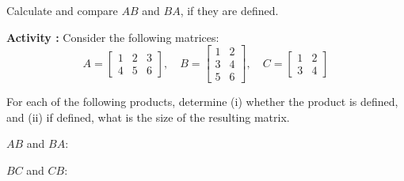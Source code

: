 \documentclass{article}
\newif\ifshowanswers
\newcommand{\answer}[2][4cm]{%
	\noindent\framebox[\textwidth]{%
		\begin{minipage}[t][#1][t]{\dimexpr\textwidth-2\fboxsep-2\fboxrule\relax}
			\ifshowanswers
			{\color{answercolor}#2\par}
			\fi
		\end{minipage}%
	}
}
\newcounter{commoncount}
\newcommand\activity{\refstepcounter{commoncount}\textbf{Activity \thecommoncount:} }
\begin{document}
Calculate and compare $AB$ and $BA$, if they are defined. 

\answer[5cm]{
	\[AB = \begin{bmatrix}
		4 & 3 \\
		-23 & -18
	\end{bmatrix}\]
	
	\[BA = \begin{bmatrix}
		-3 & 12 \\
		3 & -11
	\end{bmatrix}\]
	
	The products $AB$ and $BA$ exist but are not equal.
}


\activity Consider the following matrices:
\[A = \begin{bmatrix}1 & 2 & 3\\4 & 5 & 6\end{bmatrix}, \quad 
B = \begin{bmatrix}1 & 2\\3 & 4\\5 & 6\end{bmatrix}, \quad
C = \begin{bmatrix}1 & 2\\3 & 4\end{bmatrix}\]

For each of the following products, determine (i) whether the product is defined, and (ii) if defined, what is the size of the resulting matrix.

$AB$ and $BA$:

\answer[9cm]{
	For $AB$: Matrix $A$ is $2\times 3$ and matrix $B$ is $3\times 2$
	\begin{itemize}
		\item $AB$ is defined because the number of columns of $A$ (3) equals the number of rows of $B$ (3)
		\item The resulting matrix will be $2\times 2$
	\end{itemize}
	
	For $BA$: Matrix $B$ is $3\times 2$ and matrix $A$ is $2\times 3$
	\begin{itemize}
		\item $BA$ is defined because the number of columns of $B$ (2) equals the number of rows of $A$ (2)
		\item The resulting matrix will be $3\times 3$
	\end{itemize}
}

$BC$ and $CB$:

\answer[8cm]{
	For $BC$: Matrix $B$ is $3\times 2$ and matrix $C$ is $2\times 2$
	\begin{itemize}
		\item $BC$ is defined because the number of columns of $B$ (2) equals the number of rows of $C$ (2)
		\item The resulting matrix will be $3\times 2$
	\end{itemize}
	
	For $CB$: Matrix $C$ is $2\times 2$ and matrix $B$ is $3\times 2$
	\begin{itemize}
		\item $CB$ is not defined because the number of columns of $C$ (2) does not equal the number of rows of $B$ (3)
	\end{itemize}
}
\end{document}
